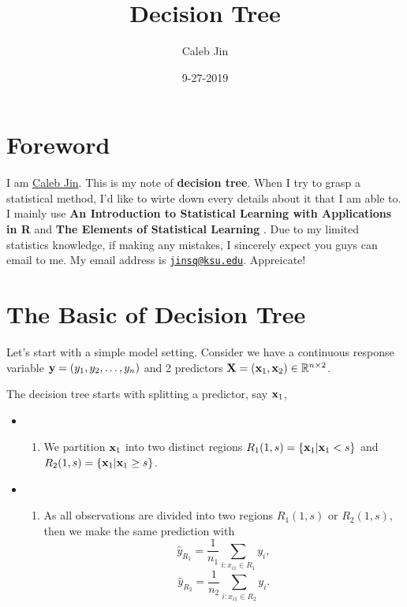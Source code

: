 \documentclass[]{book}
\title{Decision Tree}
\author{Caleb Jin}
\date{9-27-2019}
\providecommand{\tightlist}{%
  \setlength{\itemsep}{0pt}\setlength{\parskip}{0pt}}
\begin{document}
\maketitle

{
\setcounter{tocdepth}{1}
\tableofcontents
}
\hypertarget{Foreword}{%
\chapter*{Foreword}\label{Foreword}}

I am \href{https://www.sjin.name/}{Caleb Jin}. This is my note of \textbf{decision tree}. When I try to grasp a statistical method, I'd like to wirte down every details about it that I am able to. I mainly use \textbf{An Introduction to Statistical Learning with Applications in R} \citep{James2014} and \textbf{The Elements of Statistical Learning} \citep{hastie2008}. Due to my limited statistics knowledge, if making any mistakes, I sincerely expect you guys can email to me. My email address is \href{mailto:jinsq@ksu.edu}{\nolinkurl{jinsq@ksu.edu}}. Appreicate!

\newcommand\uy{{\bf y}}
\newcommand\uX{{\bf X}}
\newcommand\ux{{\bf x}}

\hypertarget{basic}{%
\chapter{The Basic of Decision Tree}\label{basic}}

Let's start with a simple model setting. Consider we have a continuous response variable \({\bf y}=(y_1,y_2, \ldots, y_n)\) and 2 predictors \({\bf X}= ({\bf x}_1,{\bf x}_2)\in \mathbb{R}^{n\times 2}\).

The decision tree starts with splitting a predictor, say \({\bf x}_1\),

\begin{itemize}
\item
  \begin{enumerate}
  \def\labelenumi{\arabic{enumi})}
  \tightlist
  \item
    We partition \({\bf x}_1\) into two distinct regions \(R_1(1,s) = \{{\bf x}_1|{\bf x}_1<s\}\) and \(R_2(1,s) = \{{\bf x}_1|{\bf x}_1\geq s\}\).
  \end{enumerate}
\item
  \begin{enumerate}
  \def\labelenumi{\arabic{enumi})}
  \setcounter{enumi}{1}
  \tightlist
  \item
    As all observations are divided into two regions \(R_1(1,s)\) or \(R_2(1,s)\), then we make the same prediction with \[
    \hat y_{R_1}=\frac{1}{n_1}\sum_{i:x_{i1}\in R_1} y_i,\]
    \[\hat y_{R_2}=\frac{1}{n_2}\sum_{i: x_{i1}\in R_2} y_i.\]
  \end{enumerate}
\end{itemize}
\end{document}
